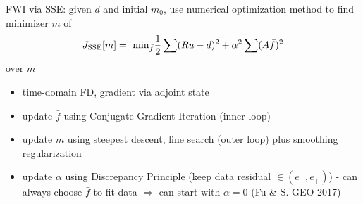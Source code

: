 \documentclass[xcolor=dvipsnames,12pt,aspectratio=169]{beamer}
\newcommand{\of}{\bar{f}}
\newcommand{\ou}{\bar{u}}
\begin{document}




\begin{frame}
FWI via SSE: given $d$ and initial $m_0$, use numerical optimization method to find minimizer $m$ of
\[
J_{\rm SSE}[m] = \mbox{ min}_{\of}\frac{1}{2} \sum (R\ou - d)^2 + \alpha^2 \sum (A\of)^2
\]
over $m$ 

\begin{itemize}
\item time-domain FD, gradient via adjoint state
\item update $\of$ using Conjugate Gradient Iteration (inner loop)
\item update $m$ using steepest descent, line search (outer loop) plus smoothing regularization
\item update $\alpha$ using Discrepancy Principle (keep data residual $\in (e_-, e_+)$) - {\color{blue} can always choose $\of$ to fit data} $\Rightarrow$ can start with $\alpha=0$ (Fu \& S. GEO 2017)
\end{itemize}
\end{frame}
\end{document}
